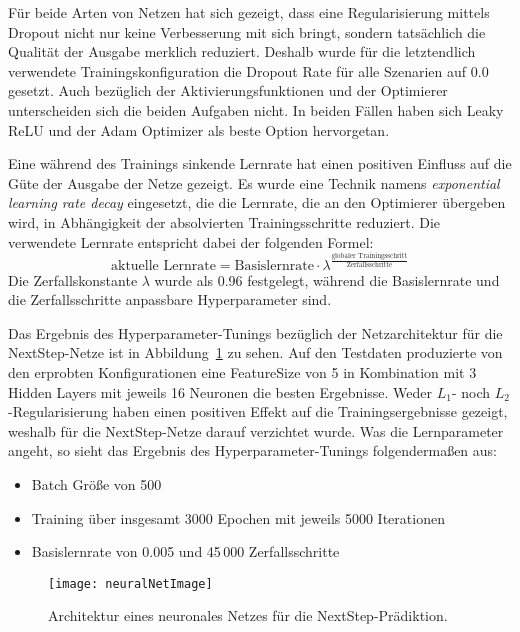 Für beide Arten von Netzen hat sich gezeigt, dass eine Regularisierung mittels Dropout nicht nur keine Verbesserung mit sich bringt, sondern tatsächlich die Qualität der Ausgabe merklich reduziert.
Deshalb wurde für die letztendlich verwendete Trainingskonfiguration die Dropout Rate für alle Szenarien auf 0.0 gesetzt. 
Auch bezüglich der Aktivierungsfunktionen und der Optimierer unterscheiden sich die beiden Aufgaben nicht. 
In beiden Fällen haben sich Leaky ReLU und der Adam Optimizer als beste Option hervorgetan.

Eine während des Trainings sinkende Lernrate hat einen positiven Einfluss auf die Güte der Ausgabe der Netze gezeigt. 
Es wurde eine Technik namens \textit{exponential learning rate decay} eingesetzt,
die die Lernrate, die an den Optimierer übergeben wird, in Abhängigkeit der absolvierten Trainingsschritte reduziert.   
Die verwendete Lernrate entspricht dabei der folgenden Formel:
\begin{equation*}
	\text{aktuelle Lernrate} = \text{Basislernrate} \cdot \lambda ^{\frac{\text{globaler Trainingsschritt}}{\text{Zerfallsschritte}}}
\end{equation*}
Die Zerfallskonstante \(\lambda\) wurde als 0.96 festgelegt, während die Basislernrate und die Zerfallsschritte anpassbare Hyperparameter sind.


Das Ergebnis des Hyperparameter-Tunings bezüglich der Netzarchitektur für die NextStep-Netze ist in Abbildung~\ref{fig:netArchitectureNextStep} zu sehen.
Auf den Testdaten produzierte von den erprobten Konfigurationen eine FeatureSize von 5 in Kombination mit 3 Hidden Layers mit jeweils 16 Neuronen die besten Ergebnisse.
Weder \(L_1\)- noch \(L_2\)-Regularisierung haben einen positiven Effekt auf die Trainingsergebnisse gezeigt, weshalb für die NextStep-Netze darauf verzichtet wurde.
Was die Lernparameter angeht, so sieht das Ergebnis des Hyperparameter-Tunings folgendermaßen aus:
\begin{itemize}
    \item Batch Größe von 500
    \item Training über insgesamt 3000 Epochen mit jeweils 5000 Iterationen
    \item Basislernrate von 0.005 und 45\,000 Zerfallsschritte
\end{itemize}

\begin{figure}[h]
    \centering
	\texttt{[image: neuralNetImage]}
	\caption{Architektur eines neuronales Netzes für die NextStep-Prädiktion.}
	\label{fig:netArchitectureNextStep}
\end{figure}

